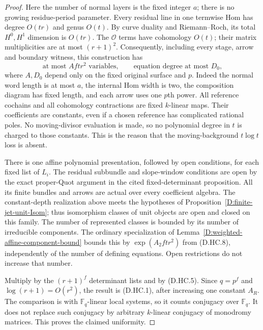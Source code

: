 \begin{proof}
Here the number of normal layers is the fixed integer $a$;
there is no growing residue-period parameter. Every residual
line in one termwise Hom has degree $O(tr)$ and genus
$O(t)$. By curve duality and Riemann--Roch, its total
$H^0,H^1$ dimension is $O(tr)$. The $\mathcal O$ terms
have cohomology $O(t)$; their matrix multiplicities are
at most $(r+1)^2$. Consequently, including every stage,
arrow and boundary witness, this construction has
\[
          \text{at most }A ftr^2\text{ variables},
       \qquad \text{equation degree at most }D_0,       \tag{D.HC.8}
\]
where $A,D_0$ depend only on the fixed original surface
and $p$. Indeed the normal word length is at most $a$,
the internal Hom width is two, the composition diagram
has fixed length, and each arrow uses one $p$th power.
All reference cochains and all cohomology contractions
are fixed $k$-linear maps. Their coefficients are constants,
even if a chosen reference has complicated rational poles.
No moving-divisor evaluation is made, so no polynomial
degree in $t$ is charged to those constants. This is the
reason that the moving-background $t\log t$ loss is absent.

There is one affine polynomial presentation, followed by
open conditions, for each fixed list of $L_i$. The residual
subbundle and slope-window conditions are open by the exact
proper-Quot argument in the cited fixed-determinant
proposition. All its finite bundles and arrows are actual
over every coefficient algebra. The constant-depth
realization above meets the hypotheses of
Proposition~\ref{D:finite-jet-unit-Isom}; thus isomorphism
classes of unit objects are open and closed on this family.
The number of represented classes is bounded by its
number of irreducible components. The ordinary specialization
of Lemma~\ref{D:weighted-affine-component-bound} bounds this
by $\exp(A_2ftr^2)$ from (D.HC.8), independently of the
number of defining equations. Open restrictions do not
increase that number.

Multiply by the $(r+1)^f$ determinant lists and by
(D.HC.5). Since $q=p^f$ and $\log(r+1)=O(r^2)$, the
result is (D.HC.1), after increasing one constant $A_R$.
The comparison is with $\mathbb F_q$-linear local systems,
so it counts conjugacy over $\mathbb F_q$. It does not
replace such conjugacy by arbitrary $k$-linear conjugacy
of monodromy matrices. This proves the claimed uniformity.
\end{proof}


